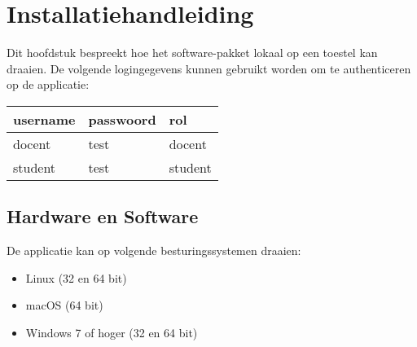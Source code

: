 \chapter{Installatiehandleiding}
\label{ch:installatiehandleiding}
Dit hoofdstuk bespreekt hoe het software-pakket lokaal op een toestel kan 
draaien. De volgende logingegevens kunnen gebruikt worden om te authenticeren op de applicatie:

\begin{table}[ht]
 \centering
 \begin{tabular}{l | l | l}
    username & passwoord & rol \\
    \hline
    docent & test & docent \\
    student & test & student
 \end{tabular}
\end{table}





\section{Hardware en Software}
\label{sec:hardware_and_software}
De applicatie kan op volgende besturingssystemen draaien:
\begin{itemize}
	\item Linux (32 en 64 bit)
	\item macOS (64 bit)
	\item Windows 7 of hoger (32 en 64 bit)
\end{itemize}

